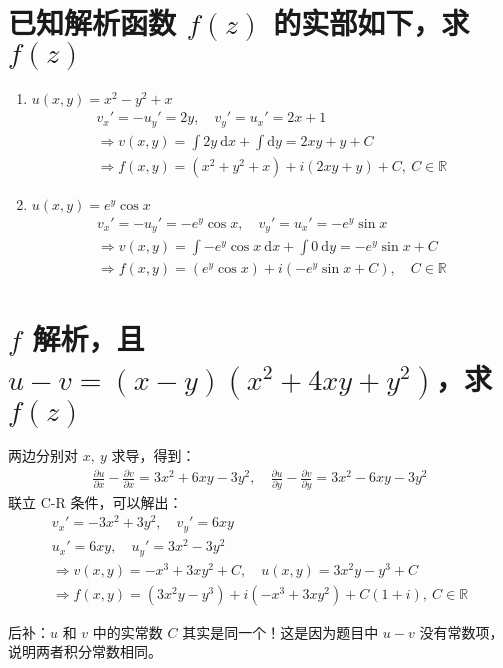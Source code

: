 \documentclass[UTF8]{report}
\def\R{\mathbb{R}}
\theoremstyle{MyLineTheoremStyle} %
\theoremstyle{MyBlockTheoremStyle} %
\theoremstyle{MySubsubsectionStyle} %
\begin{document}
\section{已知解析函数 $f(z)$ 的实部如下，求 $f(z)$}
\begin{enumerate}
\item $u(x,y) = x^2-y^2 + x$
\begin{gather*}
v_x' = -u_y' = 2y,\quad v_y' = u_x' = 2x + 1\\ 
\Longrightarrow 
v(x,y) = \int 2y \ \mathrm{d}x + \int \mathrm{d}y = 2xy + y + C \\ 
\Longrightarrow f(x,y)= (x^2 + y^2 + x )+ i(2xy + y) + C,\ C \in \R
\end{gather*}

\item $u(x,y) = e^y\cos x$
\begin{gather*}
v_x' = -u_y' = -e^y\cos x,\quad v_y' = u_x' = -e^y\sin x\\ 
\Longrightarrow
v(x,y) = \int -e^y\cos x\  \mathrm{d}x + \int 0\ \mathrm{d}y = - e^y\sin x  + C \\ 
\Longrightarrow f(x,y) = (e^y\cos x) + i(-e^y\sin x + C),\quad  C \in \R
\end{gather*}
\end{enumerate}


\section{$f$ 解析，且 $u - v = (x-y)(x^2 + 4xy + y^2)$，求 $f(z)$}
两边分别对 $x,\ y$ 求导，得到：
\begin{gather*}
\frac{\partial u }{\partial x } - \frac{\partial v }{\partial x }  = 3x^2 + 6xy -3y^2, \quad 
\frac{\partial u }{\partial y } - \frac{\partial v }{\partial y } = 3x^2 - 6xy -3y^2
\end{gather*}
联立 C-R 条件，可以解出：
\begin{gather*}
v_x' = -3x^2 + 3y^2, \quad v_y' = 6xy \\ 
u_x' = 6xy,\quad u_y' = 3x^2 - 3y^2 \\ 
\Longrightarrow v(x,y) = -x^3 + 3xy^2 + C, \quad u(x,y) = 3x^2y - y^3 + C \\ 
\Longrightarrow f(x,y) = (3x^2y - y^3) + i(-x^3 + 3xy^2) + C(1+i),\ C \in \R
\end{gather*}

{\par\color{gray}\small
后补：$u$ 和 $v$ 中的实常数 $C$ 其实是同一个！这是因为题目中 $u-v$ 没有常数项，说明两者积分常数相同。
\par}
\end{document}
